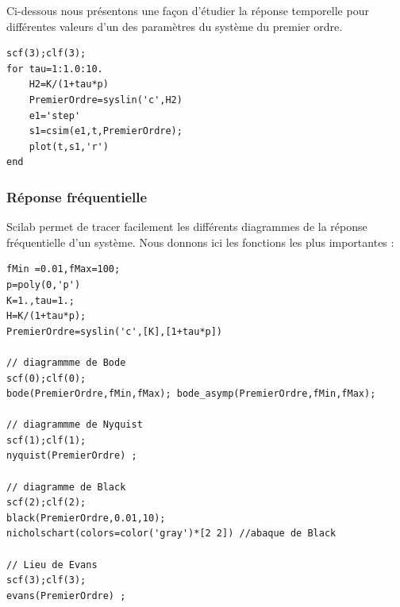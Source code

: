 Ci-dessous nous présentons une façon d'étudier la réponse temporelle pour
différentes valeurs d'un des paramètres du système du premier ordre.
\begin{code}
\begin{verbatim}
scf(3);clf(3);
for tau=1:1.0:10.
    H2=K/(1+tau*p)
    PremierOrdre=syslin('c',H2)
    e1='step'
    s1=csim(e1,t,PremierOrdre);
    plot(t,s1,'r')
end
\end{verbatim}
\end{code}


\subsubsection{Réponse fréquentielle}
Scilab permet de tracer facilement les différents diagrammes de la réponse 
fréquentielle d'un système. Nous donnons ici les fonctions les 
plus importantes : 
\begin{code}
\begin{verbatim}
fMin =0.01,fMax=100;
p=poly(0,'p')
K=1.,tau=1.;
H=K/(1+tau*p);
PremierOrdre=syslin('c',[K],[1+tau*p])

// diagrammme de Bode
scf(0);clf(0);
bode(PremierOrdre,fMin,fMax); bode_asymp(PremierOrdre,fMin,fMax);

// diagrammme de Nyquist
scf(1);clf(1);
nyquist(PremierOrdre) ;

// diagramme de Black
scf(2);clf(2);
black(PremierOrdre,0.01,10);
nicholschart(colors=color('gray')*[2 2]) //abaque de Black

// Lieu de Evans
scf(3);clf(3);
evans(PremierOrdre) ;
\end{verbatim}
\end{code}

